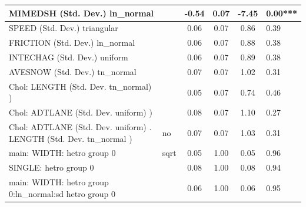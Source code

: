 \begin{table}
\begin{center}
\begin{tabular}{|l|l|c|c|c|l|}
			\hline
			MIMEDSH (Std. Dev.) ln_normal &  & -0.54 & 0.07 & -7.45 & 0.00*** \\
			\hline
			SPEED (Std. Dev.) triangular &  & 0.06 & 0.07 & 0.86 & 0.39 \\
			\hline
			FRICTION (Std. Dev.) ln_normal &  & 0.06 & 0.07 & 0.88 & 0.38 \\
			\hline
			INTECHAG (Std. Dev.) uniform &  & 0.06 & 0.07 & 0.89 & 0.38 \\
			\hline
			AVESNOW (Std. Dev.) tn_normal &  & 0.07 & 0.07 & 1.02 & 0.31 \\
			\hline
			 Chol: LENGTH (Std. Dev. tn_normal) ) &  & 0.05 & 0.07 & 0.74 & 0.46 \\
			\hline
			 Chol: ADTLANE (Std. Dev. uniform) ) &  & 0.08 & 0.07 & 1.10 & 0.27 \\
			\hline
			 Chol: ADTLANE (Std. Dev. uniform) . LENGTH (Std. Dev.   tn_normal ) & no & 0.07 & 0.07 & 1.03 & 0.31 \\
			\hline
			main: WIDTH: hetro group 0 & sqrt & 0.05 & 1.00 & 0.05 & 0.96 \\
			\hline
			SINGLE: hetro group 0 &  & 0.08 & 1.00 & 0.08 & 0.94 \\
			\hline
			main: WIDTH: hetro group 0:ln_normal:sd  hetro group 0 &  & 0.06 & 1.00 & 0.06 & 0.95 \\
			\hline
		\end{tabular}
	\end{center}
\end{table}
